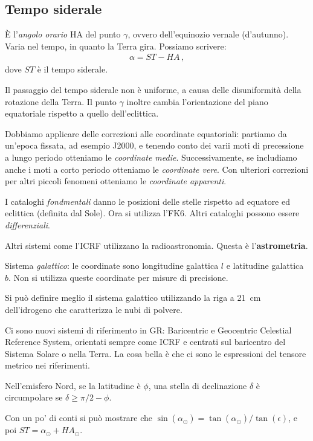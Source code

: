 \documentclass[main.tex]{subfiles}
\begin{document}
\subsection{Tempo siderale}

È l'\emph{angolo orario} HA del punto \(\gamma \), ovvero dell'equinozio vernale (d'autunno).
Varia nel tempo, in quanto la Terra gira. Possiamo scrivere: 
%
\begin{align}
\alpha = ST - HA
\,,
\end{align}
%
dove \(ST\) è il tempo siderale.

Il passaggio del tempo siderale non è uniforme, a causa delle disuniformità della rotazione della Terra. 
Il punto \(\gamma \) inoltre cambia l'orientazione del piano equatoriale rispetto a quello dell'eclittica. 

Dobbiamo applicare delle correzioni alle coordinate equatoriali: partiamo da un'epoca fissata, ad esempio J2000, e tenendo conto dei varii moti di precessione a lungo periodo otteniamo le \emph{coordinate medie}. Successivamente, se includiamo anche i moti a corto periodo otteniamo le \emph{coordinate vere}. 
Con ulteriori correzioni per altri piccoli fenomeni otteniamo le \emph{coordinate apparenti}.

I cataloghi \emph{fondmentali} danno le posizioni delle stelle rispetto ad equatore ed eclittica (definita dal Sole).
Ora si utilizza l'FK6. Altri cataloghi possono essere \emph{differenziali}. 

Altri sistemi come l'ICRF utilizzano la radioastronomia. Questa è l'\textbf{astrometria}.

Sistema \emph{galattico}: le coordinate sono longitudine galattica \(l\) e latitudine galattica \(b\). Non si utilizza queste coordinate per misure di precisione.

Si può definire meglio il sistema galattico utilizzando la riga a \SI{21}{cm} dell'idrogeno che caratterizza le nubi di polvere.


Ci sono nuovi sistemi di riferimento in GR: Baricentric e Geocentric Celestial Reference System, orientati sempre come ICRF e centrati sul baricentro del Sistema Solare o nella Terra.
La cosa bella è che ci sono le espressioni del tensore metrico nei riferimenti. 


Nell'emisfero Nord, se la latitudine è \(\phi \), una stella di declinazione \(\delta \) è circumpolare se \(\delta \geq \pi /2 - \phi \).

Con un po' di conti si può mostrare che \(\sin(\alpha _{\odot}) = \tan(\alpha _{\odot}) / \tan( \epsilon )\), e poi \(ST = \alpha _{\odot} + HA _{\odot}\).
\end{document}
